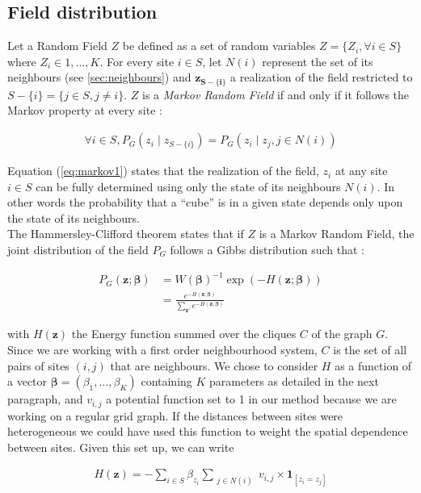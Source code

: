 	\subsection{Field distribution}
Let a Random Field $Z$ be defined as a set of random variables $Z = \{Z_i , \forall i \in S\}$ where $Z_i \in {1,...,K}$. For every site $i \in S$, let $N(i)$ represent the set of its neighbours (see \ref{sec:neighbours}) and $\boldsymbol{z_{S-\{i\}}}$ a realization of the field restricted to $S-\{i\} = \{j \in S, j \neq i\}$. $Z$ is a \emph{Markov Random Field} if and only if it follows the Markov property at every site :

\begin{align}
\label{eq:markov1}
\forall i \in S, P_G (z_i \mid z_{S-\{i\}}) = P_G (z_i \mid z_j , j \in N(i))
\end{align}

Equation (\ref{eq:markov1}) states that the realization of the field, $z_{i}$ at any site $i \in S$ can be fully determined using only the state of its neighbours $N(i)$. In other words the probability that a ``cube'' is in a given state depends only upon the state of its neighbours.\\

The Hammersley-Clifford theorem states that if $Z$ is a Markov Random Field, the joint distribution of the field $P_G$ follows a Gibbs distribution such that :

\begin{align}
\label{eq:prior}
P_G (\boldsymbol{z;\beta}) &= W(\boldsymbol{\beta})^{-1} \exp{(-H(\boldsymbol{z;\beta}))} \nonumber\\
&= \frac{e^{-H(\boldsymbol{z;\beta})}}{\sum\limits_{\boldsymbol{z'}} e^{-H(\boldsymbol{z;\beta})}}
\end{align}

with $H(\boldsymbol{z})$ the Energy function summed over the cliques $C$ of the graph $G$. Since we are working with a first order neighbourhood system, $C$ is the set of all pairs of sites $(i,j)$ that are neighbours. We chose to consider $H$ as a function of a vector $\boldsymbol{\beta} = (\beta_1, \hdots, \beta_K)$ containing $K$ parameters as detailed in the next paragraph, and $v_{i,j}$ a potential function set to 1 in our method because we are working on a regular grid graph. If the distances between sites were heterogeneous we could have used this function to weight the spatial dependence between sites. Given this set up, we can write

\begin{align}
\label{eq:Energy}
H(\boldsymbol{z}) = - \sum\limits_{i \in S}\beta_{z_i}\sum_{\substack{j \in N(i)}}v_{i,j}\times\boldsymbol{1}_{[z_i = z_j]} 
\end{align}

